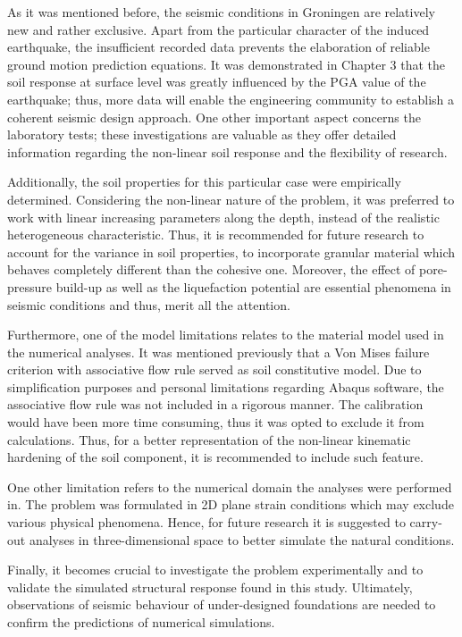 As it was mentioned before, the seismic conditions in Groningen are relatively new and rather exclusive. Apart from the particular character of the induced earthquake, the insufficient recorded data prevents the elaboration of reliable ground motion prediction equations. It was demonstrated in Chapter 3 that the soil response at surface level was greatly influenced by the PGA value of the earthquake; thus, more data will enable the engineering community to establish a coherent seismic design approach. One other important aspect concerns the laboratory tests; these investigations are valuable as they offer detailed information regarding the non-linear soil response and the flexibility of research.

Additionally, the soil properties for this particular case were empirically determined. Considering the non-linear nature of the problem, it was preferred to work with linear increasing parameters along the depth, instead of the realistic heterogeneous characteristic. Thus, it is recommended for future research to account for the variance in soil properties, to incorporate granular material which behaves completely different than the cohesive one. Moreover, the effect of pore-pressure build-up as well as the liquefaction potential are essential phenomena in seismic conditions and thus, merit all the attention.

Furthermore, one of the model limitations relates to the material model used in the numerical analyses. It was mentioned previously that a Von Mises failure criterion with associative flow rule served as soil constitutive model. Due to simplification purposes and personal limitations regarding Abaqus software, the associative flow rule was not included in a rigorous manner. The calibration would have been more time consuming, thus it was opted to exclude it from calculations. Thus, for a better representation of the non-linear kinematic hardening of the soil component, it is recommended to include such feature.

One other limitation refers to the numerical domain the analyses were performed in. The problem was formulated in 2D plane strain conditions which may exclude various physical \mbox{phenomena}. Hence, for future research it is suggested to carry-out analyses in three-dimensional space to better simulate the natural conditions. 

Finally, it becomes crucial to investigate the problem experimentally and to validate the simulated structural response found in this study. Ultimately, observations of seismic behaviour of under-designed foundations are needed to confirm the predictions of numerical simulations.



